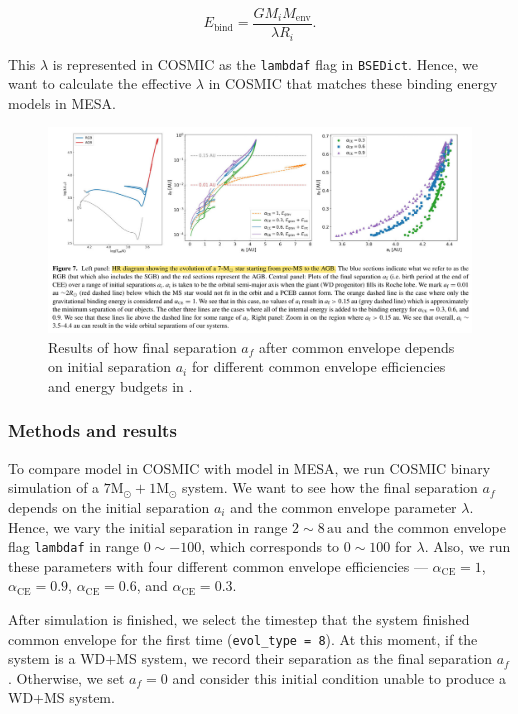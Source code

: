 \documentclass[12pt]{article}
\newcommand{\Msun}{\mathrm{M_{\odot}}}
\newcommand{\alphace}{\alpha_{\mathrm{CE}}}
\newcommand{\Ebind}{E_{\mathrm{bind}}}
\newcommand{\au}{\, \mathrm{au}}
\begin{document}
\begin{equation}
	\Ebind = \frac{G M_i M_{\mathrm{env}}}{\lambda R_i}.   
	\label{ebind}
\end{equation}

This $\lambda$ is represented in COSMIC as the \verb|lambdaf| flag in \verb|BSEDict|. Hence, we want to calculate the effective $\lambda$ in COSMIC that matches these binding energy models in MESA.

\begin{figure}
    \centering
    \includegraphics[width=\linewidth]{yamaguchi-7+1.png}
    \caption{Results of how final separation $a_f$ after common envelope depends on initial separation $a_i$ for different common envelope efficiencies and energy budgets in \cite{yamaguchi_hi}.}
    \label{yam_hi}
\end{figure}

\subsubsection{Methods and results}
To compare model in COSMIC with model in MESA, we run COSMIC binary simulation of a $7\Msun + 1\Msun$ system. We want to see how the final separation $a_f$ depends on the initial separation $a_i$ and the common envelope parameter $\lambda$. Hence, we vary the initial separation in range $2 \sim 8 \au$ and the common envelope flag \verb|lambdaf| in range $0 \sim -100$, which corresponds to $0 \sim 100$ for $\lambda$. Also, we run these parameters with four different common envelope efficiencies — $\alphace = 1$, $\alphace = 0.9$, $\alphace = 0.6$, and $\alphace = 0.3$.

After simulation is finished, we select the timestep that the system finished common envelope for the first time (\verb|evol_type = 8|). At this moment, if the system is a WD+MS system, we record their separation as the final separation $a_f$. Otherwise, we set $a_f = 0$ and consider this initial condition unable to produce a WD+MS system.
\end{document}
